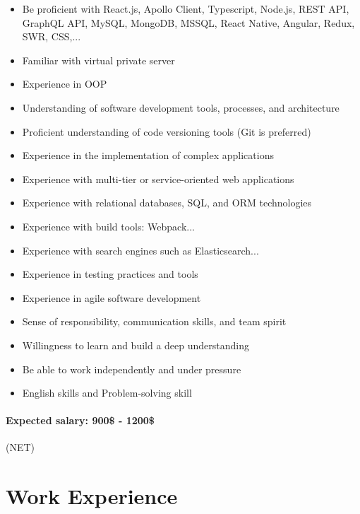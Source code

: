 \documentclass[10pt]{article} %
\begin{document}
\begin{itemize}
  \item Be proficient with React.js, Apollo Client, Typescript, Node.js, REST API, GraphQL API, MySQL, MongoDB, MSSQL, React Native, Angular, Redux, SWR, CSS,...
  \item Familiar with virtual private server
  \item Experience in OOP
  \item Understanding of software development tools, processes, and architecture
  \item Proficient understanding of code versioning tools (Git is preferred)
  \item Experience in the implementation of complex applications
  \item Experience with multi-tier or service-oriented web applications
  \item Experience with relational databases, SQL, and ORM technologies
  \item Experience with build tools: Webpack...
  \item Experience with search engines such as Elasticsearch...
  \item Experience in testing practices and tools
  \item Experience in agile software development
  \item Sense of responsibility, communication skills, and team spirit
  \item Willingness to learn and build a deep understanding
  \item Be able to work independently and under pressure
  \item English skills and Problem-solving skill
\end{itemize}

\paragraph{Expected salary: 900\$ - 1200\$} (NET)

\section{Work Experience}

\end{document}
